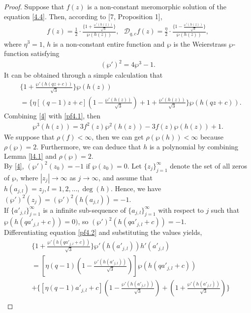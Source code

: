 \documentclass[sn-mathphys-num]{sn-jnl}%
\theoremstyle{thmstyleone}%
\theoremstyle{thmstyletwo}%
\theoremstyle{thmstylethree}%
\begin{document}
\begin{proof}
	Suppose that \(f(z)\) is a non-constant meromorphic solution of the equation \eqref{4.4}. Then, according to [7, Proposition 1],
	\begin{align}\label{pf4.1}
		f(z)=\frac{1}{2}\cdotp\frac{\{1+\frac{\wp'(h(z))}{\sqrt{3}}\}}{\wp(h(z))},~~~ \mathcal{D}_{q,c}f(z)=\frac{\eta}{2}\cdotp\frac{\{1-\frac{\wp'(h(z))}{\sqrt{3}}\}}{\wp(h(z))},
	\end{align}
	where \(\eta^{3}=1\), \(h\) is a non-constant entire function and \(\wp\) is the Weierstrass \(\wp\)-function satisfying
	\begin{align}\label{4}
		(\wp')^{2}=4\wp^{3}-1.
	\end{align}
	It can be obtained through a simple calculation that
	\begin{align}\label{pf4.2}
		&\{1+\frac{\wp'(h(qz+c))}{\sqrt{3}}\}{\wp(h(z))}\nonumber\\
		&=\{\eta[(q-1)z+c](1-\frac{\wp'(h(z))}{\sqrt{3}})+1+\frac{\wp'(h(z))}{\sqrt{3}}\}\wp(h(qz+c)).
	\end{align}
	\indent Combining \eqref{4} with \eqref{pf4.1}, then
	\begin{align*}
		\wp^{3}(h(z))=3f^{2}(z)\wp^{2}(h(z))-3f(z)\wp(h(z))	+1.
	\end{align*}
	\indent We suppose that \(\rho(f)<\infty\), then we can get \(\rho(\wp(h))<\infty\) because \(\rho(\wp)=2\). Furthermore, we can deduce that \(h\) is a polynomial by combining Lemma \ref{l4.1} and \(\rho(\wp)=2\).\\
	\indent By \eqref{4}, \((\wp')^{2}(z_{0})=-1\) if \(\wp(z_{0})=0\). Let \(\{z_{j}\}_{j=1}^{\infty}\) denote the set of all zeros of \(\wp\), where \(|z_{j}|\to\infty\) as \(j\to\infty\), and assume that \(h(a_{j,l})=z_{j}, l=1,2,...,\deg(h)\). Hence, we have \((\wp')^{2}(z_{j})=(\wp')^{2}(h(a_{j,l}))=-1\).\\
	\indent If \(\{a'_{j,l}\}_{j=1}^{\infty}\) is a infinite sub-sequence of \(\{a_{j,l}\}_{j=1}^{\infty}\) with respect to \(j\) such that \(\wp(h(qa'_{j,l}+c))=0)\), so \((\wp')^{2}(h(qa'_{j,l}+c))=-1\).\\
	\indent Differentiating equation \eqref{pf4.2} and substituting the values yields,
	\begin{align}\label{pf4.3}
		&\{1+\frac{\wp'(h(qa'_{j,l}+c))}{\sqrt{3}}\}\wp'(h(a'_{j,l}))h'(a'_{j,l})\nonumber\\
		&=[\eta(q-1)(1-\frac{\wp'(h(a'_{j,l}))}{\sqrt{3}})]\wp(h(qa'_{j,l}+c))\\
		&+\{[\eta(q-1)a'_{j,l}+c](1-\frac{\wp'(h(a'_{j,l}))}{\sqrt{3}})+(1+\frac{\wp'(h(a'_{j,l}))}{\sqrt{3}})\}\nonumber\\

\end{align}
\end{proof}
\end{document}
